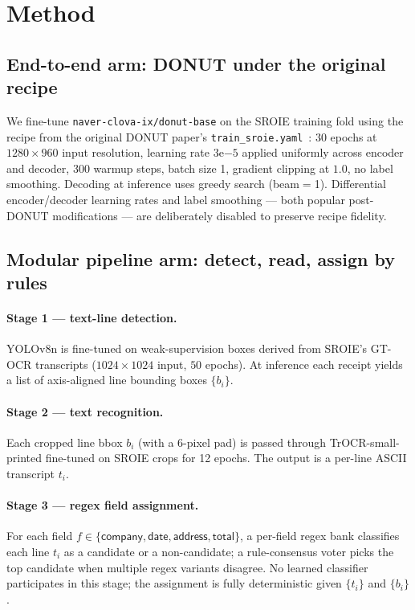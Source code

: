\section{Method}
\label{sec:method}

\subsection{End-to-end arm: DONUT under the original recipe}

We fine-tune \texttt{naver-clova-ix/donut-base} on the SROIE training
fold using the recipe from the original DONUT paper's
\texttt{train\_sroie.yaml}~\cite{kim2022donut}: 30 epochs at
$1280\times960$ input resolution, learning rate $3\mathrm{e}{-5}$
applied uniformly across encoder and decoder, $300$ warmup steps,
batch size 1, gradient clipping at $1.0$, no label smoothing.
Decoding at inference uses greedy search (beam$=$1).  Differential
encoder/decoder learning rates and label smoothing — both popular
post-DONUT modifications — are deliberately disabled to preserve
recipe fidelity.

\subsection{Modular pipeline arm: detect, read, assign by rules}

\paragraph{Stage 1 --- text-line detection.}  YOLOv8n is fine-tuned
on weak-supervision boxes derived from SROIE's GT-OCR transcripts
($1024\times 1024$ input, $50$ epochs).  At inference each receipt
yields a list of axis-aligned line bounding boxes $\{b_i\}$.

\paragraph{Stage 2 --- text recognition.}  Each cropped line bbox
$b_i$ (with a 6-pixel pad) is passed through TrOCR-small-printed
fine-tuned on SROIE crops for 12 epochs.  The output is a per-line
ASCII transcript $t_i$.

\paragraph{Stage 3 --- regex field assignment.}  For each field
$f \in \{\textsf{company}, \textsf{date}, \textsf{address},
\textsf{total}\}$, a per-field regex bank classifies each line $t_i$
as a candidate or a non-candidate; a rule-consensus voter picks the
top candidate when multiple regex variants disagree.  No learned
classifier participates in this stage; the assignment is fully
deterministic given $\{t_i\}$ and $\{b_i\}$.

